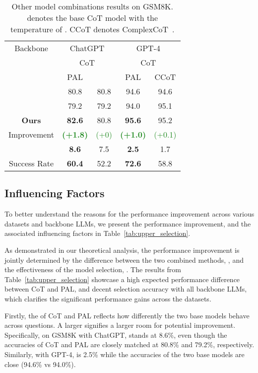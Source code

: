 \documentclass[11pt]{article}
\begin{document}
\begin{table}[ht]
    \centering
    \small
    \begin{tabular}{c|cc|cc}
    \toprule
          Backbone & \multicolumn{2}{c|}{ChatGPT} & \multicolumn{2}{c}{GPT-4}\\
           & \multicolumn{2}{c|}{CoT} & \multicolumn{2}{c}{CoT} \\
           & PAL &  & PAL & CCoT\\
         \midrule
          & 80.8 & 80.8 & 94.6 & 94.6\\
          & 79.2 & 79.2 & 94.0 & 95.1 \\
\textbf{Ours} & \textbf{82.6} & 80.8 & \textbf{95.6} & 95.2 \\
          Improvement & \textbf{\textcolor{ForestGreen}{(+1.8)}} & \textcolor{ForestGreen}{(+0)} & \textbf{\textcolor{ForestGreen}{(+1.0)}} &\textcolor{ForestGreen}{(+0.1)}\\
         & \textbf{8.6} & 7.5 & \textbf{2.5} & 1.7 \\
         Success Rate & \textbf{60.4} & 52.2 & \textbf{72.6} & 58.8\\
         \bottomrule
    \end{tabular}
    \caption{Other model combinations results on GSM8K.  denotes the base CoT model with the temperature of . CCoT denotes ComplexCoT~\citep{Fu2022ComplexityBasedPF}. 
    }
    \label{tab:other_combinations}
\end{table}


\subsection{Influencing Factors}
To better understand the reasons for the performance improvement across various datasets and backbone LLMs, we present the performance improvement, and the associated influencing factors in Table~\ref{tab:upper_selection}.  

As demonstrated in our theoretical analysis, the performance improvement is jointly determined by the difference between the two combined methods, , and the effectiveness of the model selection, . The results from Table~\ref{tab:upper_selection} showcase a high expected performance difference between CoT and PAL, and decent selection accuracy with all backbone LLMs, which clarifies the significant performance gains across the datasets.  

Firstly, the  of CoT and PAL reflects how differently the two base models behave across questions.  A larger  signifies a larger room for potential improvement. Specifically, on GSM8K with ChatGPT,  stands at 8.6\%, even though the accuracies of CoT and PAL are closely matched at 80.8\% and 79.2\%, respectively. Similarly, with GPT-4,  is 2.5\% while the accuracies of the two base models are close (94.6\% vs 94.0\%). 
\end{document}
